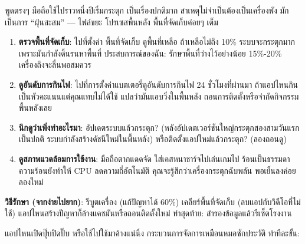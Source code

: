 


พูดตรงๆ มือถือใช้ไปราวหนึ่งปีเริ่มกระตุก เป็นเรื่องปกติมาก สาเหตุไม่จำเป็นต้องเป็นเครื่องพัง มักเป็นการ “ฝุ่นสะสม” — ไฟล์ขยะ โปรเซสพื้นหลัง พื้นที่จัดเก็บค่อยๆ เต็ม


\begin{enumerate}
  \item \textbf{ตรวจพื้นที่จัดเก็บ}: ไปที่ตั้งค่า พื้นที่จัดเก็บ ดูพื้นที่เหลือ ถ้าเหลือไม่ถึง 10\% ระบบจะกระตุกมาก เพราะมันกำลังดิ้นรนหาพื้นที่ ประสบการณ์ของฉัน: รักษาพื้นที่ว่างไว้อย่างน้อย 15\%-20\% เครื่องถึงจะลื่นพอสมควร
  \item \textbf{ดูอันดับการกินไฟ}: ไปที่การตั้งค่าแบตเตอรี่ดูอันดับการกินไฟ 24 ชั่วโมงที่ผ่านมา ถ้าแอปไหนกินเป็นหัวคะแนนแต่คุณแทบไม่ได้ใช้ แปลว่ามันแอบวิ่งในพื้นหลัง ถอนการติดตั้งหรือจำกัดกิจกรรมพื้นหลังเลย
  \item \textbf{นึกดูว่าเพิ่งทำอะไรมา}: อัปเดตระบบแล้วกระตุก? (หลังอัปเดตเวอร์ชันใหญ่กระตุกสองสามวันแรกเป็นปกติ ระบบกำลังสร้างดัชนีใหม่ในพื้นหลัง) หรือติดตั้งแอปใหม่แล้วกระตุก? (ลองถอนดู)
  \item \textbf{ดูสภาพแวดล้อมการใช้งาน}: มือถือตากแดดจัด ใส่เคสหนาชาร์จไปเล่นเกมไป ร้อนเป็นธรรมดา ความร้อนยังทำให้ CPU ลดความถี่อัตโนมัติ คุณจะรู้สึกว่าเครื่องกระตุกฉับพลัน พอเย็นลงค่อยลองใหม่
\end{enumerate}

\textbf{วิธีรักษา (จากง่ายไปยาก)}: รีบูตเครื่อง (แก้ปัญหาได้ 60\%) เคลียร์พื้นที่จัดเก็บ (ลบแอปกับวิดีโอที่ไม่ใช้) แอปไหนสร้างปัญหาก็ล้างแคชมันหรือถอนติดตั้งใหม่ ท่าสุดท้าย: สำรองข้อมูลแล้วรีเซ็ตโรงงาน


แอปไหนเปิดปุ๊บปิดปั๊บ หรือใช้ไปใช้มาค้างแน่นิ่ง กระบวนการจัดการเหมือนหมอซักประวัติ ทำทีละขั้น:

